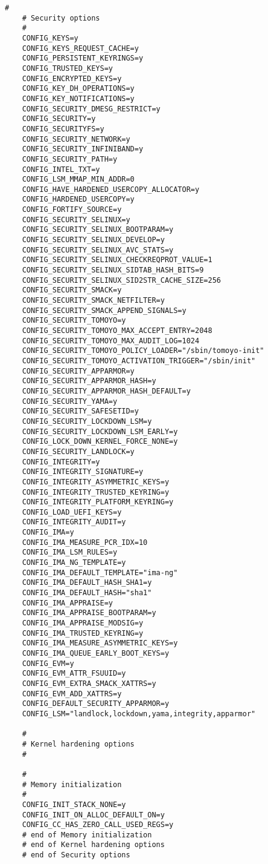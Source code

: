 \begin{multicols}{2}
\begin{lstlisting}[caption=kernel config,label=kconfig,]
    #
    # Security options
    #
    CONFIG_KEYS=y
    CONFIG_KEYS_REQUEST_CACHE=y
    CONFIG_PERSISTENT_KEYRINGS=y
    CONFIG_TRUSTED_KEYS=y
    CONFIG_ENCRYPTED_KEYS=y
    CONFIG_KEY_DH_OPERATIONS=y
    CONFIG_KEY_NOTIFICATIONS=y
    CONFIG_SECURITY_DMESG_RESTRICT=y
    CONFIG_SECURITY=y
    CONFIG_SECURITYFS=y
    CONFIG_SECURITY_NETWORK=y
    CONFIG_SECURITY_INFINIBAND=y
    CONFIG_SECURITY_PATH=y
    CONFIG_INTEL_TXT=y
    CONFIG_LSM_MMAP_MIN_ADDR=0
    CONFIG_HAVE_HARDENED_USERCOPY_ALLOCATOR=y
    CONFIG_HARDENED_USERCOPY=y
    CONFIG_FORTIFY_SOURCE=y
    CONFIG_SECURITY_SELINUX=y
    CONFIG_SECURITY_SELINUX_BOOTPARAM=y
    CONFIG_SECURITY_SELINUX_DEVELOP=y
    CONFIG_SECURITY_SELINUX_AVC_STATS=y
    CONFIG_SECURITY_SELINUX_CHECKREQPROT_VALUE=1
    CONFIG_SECURITY_SELINUX_SIDTAB_HASH_BITS=9
    CONFIG_SECURITY_SELINUX_SID2STR_CACHE_SIZE=256
    CONFIG_SECURITY_SMACK=y
    CONFIG_SECURITY_SMACK_NETFILTER=y
    CONFIG_SECURITY_SMACK_APPEND_SIGNALS=y
    CONFIG_SECURITY_TOMOYO=y
    CONFIG_SECURITY_TOMOYO_MAX_ACCEPT_ENTRY=2048
    CONFIG_SECURITY_TOMOYO_MAX_AUDIT_LOG=1024
    CONFIG_SECURITY_TOMOYO_POLICY_LOADER="/sbin/tomoyo-init"
    CONFIG_SECURITY_TOMOYO_ACTIVATION_TRIGGER="/sbin/init"
    CONFIG_SECURITY_APPARMOR=y
    CONFIG_SECURITY_APPARMOR_HASH=y
    CONFIG_SECURITY_APPARMOR_HASH_DEFAULT=y
    CONFIG_SECURITY_YAMA=y
    CONFIG_SECURITY_SAFESETID=y
    CONFIG_SECURITY_LOCKDOWN_LSM=y
    CONFIG_SECURITY_LOCKDOWN_LSM_EARLY=y
    CONFIG_LOCK_DOWN_KERNEL_FORCE_NONE=y
    CONFIG_SECURITY_LANDLOCK=y
    CONFIG_INTEGRITY=y
    CONFIG_INTEGRITY_SIGNATURE=y
    CONFIG_INTEGRITY_ASYMMETRIC_KEYS=y
    CONFIG_INTEGRITY_TRUSTED_KEYRING=y
    CONFIG_INTEGRITY_PLATFORM_KEYRING=y
    CONFIG_LOAD_UEFI_KEYS=y
    CONFIG_INTEGRITY_AUDIT=y
    CONFIG_IMA=y
    CONFIG_IMA_MEASURE_PCR_IDX=10
    CONFIG_IMA_LSM_RULES=y
    CONFIG_IMA_NG_TEMPLATE=y
    CONFIG_IMA_DEFAULT_TEMPLATE="ima-ng"
    CONFIG_IMA_DEFAULT_HASH_SHA1=y
    CONFIG_IMA_DEFAULT_HASH="sha1"
    CONFIG_IMA_APPRAISE=y
    CONFIG_IMA_APPRAISE_BOOTPARAM=y
    CONFIG_IMA_APPRAISE_MODSIG=y
    CONFIG_IMA_TRUSTED_KEYRING=y
    CONFIG_IMA_MEASURE_ASYMMETRIC_KEYS=y
    CONFIG_IMA_QUEUE_EARLY_BOOT_KEYS=y
    CONFIG_EVM=y
    CONFIG_EVM_ATTR_FSUUID=y
    CONFIG_EVM_EXTRA_SMACK_XATTRS=y
    CONFIG_EVM_ADD_XATTRS=y
    CONFIG_DEFAULT_SECURITY_APPARMOR=y
    CONFIG_LSM="landlock,lockdown,yama,integrity,apparmor"
    
    #
    # Kernel hardening options
    #
    
    #
    # Memory initialization
    #
    CONFIG_INIT_STACK_NONE=y
    CONFIG_INIT_ON_ALLOC_DEFAULT_ON=y
    CONFIG_CC_HAS_ZERO_CALL_USED_REGS=y
    # end of Memory initialization
    # end of Kernel hardening options
    # end of Security options
    

\end{lstlisting}
\end{multicols}
